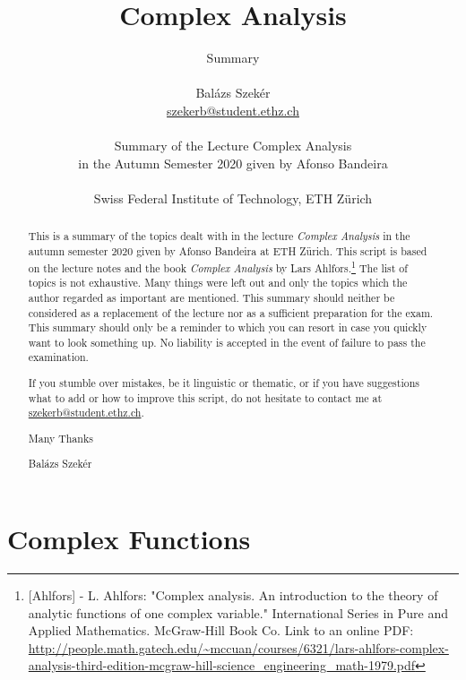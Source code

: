 \documentclass[a4paper]{article}
\title{Complex Analysis}
\author{Summary \\ \\ Balázs Szekér \\ \href{mailto:szekerb@student.ethz.ch}{szekerb@student.ethz.ch} \\ \\
Summary of the Lecture Complex Analysis \\ in the Autumn Semester 2020 given by
Afonso Bandeira \\ \\ Swiss Federal Institute of Technology, ETH Zürich}
\begin{document}
\begin{titlepage}
    \maketitle
    \thispagestyle{empty}
\end{titlepage}
\pagebreak
{} 
\thispagestyle{myplain}
\begin{abstract}
    This is a summary of the topics dealt with in the lecture \textit{Complex
    Analysis} in the autumn semester 2020 given by Afonso Bandeira at ETH Zürich.
    This script is based on the lecture notes and the book \textit{Complex Analysis}
    by Lars Ahlfors.\footnote{[Ahlfors] - L. Ahlfors: "Complex analysis. An
    introduction to the theory of analytic functions of one complex variable."
    International Series in Pure and Applied Mathematics. McGraw-Hill Book Co.
    Link to an online PDF: \url{http://people.math.gatech.edu/~mccuan/courses/6321/lars-ahlfors-complex-analysis-third-edition-mcgraw-hill-science_engineering_math-1979.pdf}}
    The list of topics is not exhaustive. Many things were left out and only the
    topics which the author regarded as important are mentioned.
    This summary should neither be considered as a replacement of the lecture nor as
    a sufficient preparation for the exam. This summary should only be a reminder to
    which you can resort in case you quickly want to look something up.
    No liability is accepted in the event of failure to pass the examination.

    \vspace{1\baselineskip}

    If you stumble over mistakes, be it linguistic or thematic, or if you have suggestions
    what to add or how to improve this script, do not hesitate to contact me at
    \href{mailto:szekerb@student.ethz.ch}{szekerb@student.ethz.ch}.

    \vspace{1\baselineskip}

    Many Thanks
    
    \vspace{1\baselineskip}

    Balázs Szekér
\end{abstract}
\newpage
\thispagestyle{myplain}
\tableofcontents
\pagebreak
{}

\section{Complex Functions}
\end{document}
